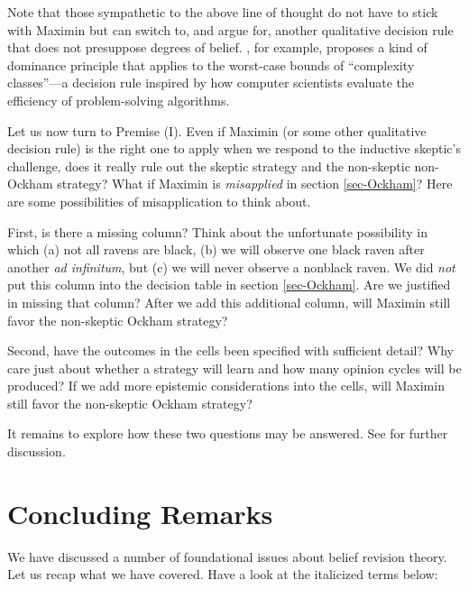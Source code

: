 Note that those sympathetic to the above line of thought do not have to stick with Maximin but can switch to, and argue for, another qualitative decision rule that does not presuppose degrees of belief. \citet{kelly2007simplicity}, for example, proposes a kind of dominance principle that applies to the worst-case bounds of ``complexity classes''---a decision rule inspired by how computer scientists evaluate the efficiency of problem-solving algorithms.

Let us now turn to Premise (I). Even if Maximin (or some other qualitative decision rule) is the right one to apply when we respond to the inductive skeptic's challenge, does it really rule out the skeptic strategy and the non-skeptic non-Ockham strategy? What if Maximin is {\em misapplied} in section \ref{sec-Ockham}? Here are some possibilities of misapplication to think about. \op

	\im First, is there a missing column? Think about the unfortunate possibility in which (a) not all ravens are black, (b) we will observe one black raven after another {\em ad infinitum}, but (c) we will never observe a nonblack raven. We did {\em not} put this column into the decision table in section \ref{sec-Ockham}. Are we justified in missing that column? After we add this additional column, will Maximin still favor the non-skeptic Ockham strategy? 

	\im Second, have the outcomes in the cells been specified with sufficient detail? Why care just about whether a strategy will learn and how many opinion cycles will be produced? If we add more epistemic considerations into the cells, will Maximin still favor the non-skeptic Ockham strategy? 

\ed It remains to explore how these two questions may be answered. See \citet{kelly2007simplicity} for further discussion.



\section{Concluding Remarks}\label{lin-conclusion}

We have discussed a number of foundational issues about belief revision theory. Let us recap what we have covered. Have a look at the italicized terms below: \op

